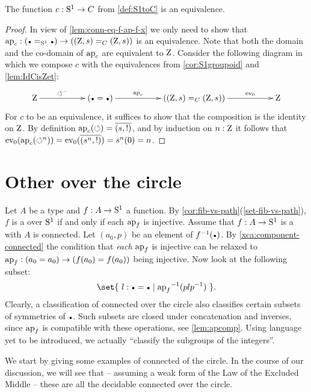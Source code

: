 \begin{theorem}\label{thm:S1bysymmetries}
  The function $c:{\mathrm{S}^1}\to C$ from \cref{def:S1toC} is an equivalence.
\end{theorem}
\begin{proof}
  In view of \cref{lem:conn-eq-f-ap-f-x} we only need to show that 
$\ap{c}:(\base=_{\Sc}\base)\to((\zet,\etop{s})=_C(\zet,\etop{s}))$ is an equivalence.
Note that both the domain and the co-domain of $\ap{c}$ are equivalent to $\mathrm{Z}$.
Consider the following diagram in which we compose $c$ with the equivalences
from \cref{cor:S1groupoid} and \cref{lem:IdCisZet}:
\[
\xymatrix{
\zet\ar[rr]^-{\Sloop^{{-}}}&&
(\base=\base)\ar[rr]^-{\ap{c}}&&
((\zet,\etop{s})=_C(\zet,\etop{s}))\ar[rr]^-{\ev_0}&&
\zet}
\]
For $c$ to be an equivalence, it suffices to show that the composition
is the identity on $\mathrm{Z}$. By definition $\ap{c}(\Sloop) = \pathpair{\etop{s}}{!}$, 
and by induction on $n:\mathrm{Z}$ it follows that
$\ev_0(\ap{c}(\Sloop^n))=\ev_0(\pathpair{\etop{s}^n}{!}) = s^n(0) = n$.
\end{proof}

\section{Other \coverings over the circle}
\label{sec:covS1}

Let $A$ be a type and $f:A\to {\mathrm{S}^1}$ a function.
By \cref{cor:fib-vs-path}(\ref{set-fib-vs-path}), $f$ is a \covering
over ${\mathrm{S}^1}$ if and only if each $\ap{f}$ is injective.
Assume that $f:A\to {\mathrm{S}^1}$ is a \covering with $A$ is connected.
Let $(a_0,p)$ be an element of $f^{-1}(\base)$. 
By \cref{xca:component-connected}
the condition that \emph{each} $\ap{f}$ is injective
can be relaxed to $\ap{f}: (a_0=a_0)\to(f(a_0)=f(a_0))$ being injective.
Now look at the following subset:
\[
\set{~ l: \base = \base \mid {\ap{f}}^{-1}(plp^{-1})~ }.
\]
Clearly, a classification of connected \coverings over the circle
also classifies certain subsets of symmetries of $\base$.
Such subsets are closed under concatenation and inverses,
since $\ap{f}$ is compatible with these operations,
see \cref{lem:apcomp}.
Using language yet to be introduced, we actually ``classify the subgroups of the integers''.

We start by giving some examples of connected \coverings of the circle.
In the course of our discussion, we will see that -- assuming a weak form
of the Law of the Excluded Middle -- these are all the decidable connected 
\coverings over the circle.

